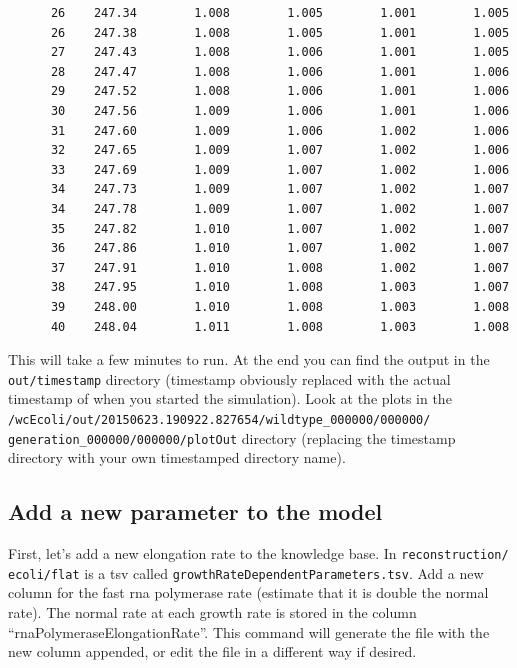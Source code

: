 \documentclass[12pt]{article}
\begin{document}
\begin{lstlisting}
      26    247.34        1.008        1.005        1.001        1.005
      26    247.38        1.008        1.005        1.001        1.005
      27    247.43        1.008        1.006        1.001        1.005
      28    247.47        1.008        1.006        1.001        1.006
      29    247.52        1.008        1.006        1.001        1.006
      30    247.56        1.009        1.006        1.001        1.006
      31    247.60        1.009        1.006        1.002        1.006
      32    247.65        1.009        1.007        1.002        1.006
      33    247.69        1.009        1.007        1.002        1.006
      34    247.73        1.009        1.007        1.002        1.007
      34    247.78        1.009        1.007        1.002        1.007
      35    247.82        1.010        1.007        1.002        1.007
      36    247.86        1.010        1.007        1.002        1.007
      37    247.91        1.010        1.008        1.002        1.007
      38    247.95        1.010        1.008        1.003        1.007
      39    248.00        1.010        1.008        1.003        1.008
      40    248.04        1.011        1.008        1.003        1.008
\end{lstlisting}

\hfill \break
\hfill \break

This will take a few minutes to run. At the end you can find the output in the \texttt{out/timestamp} directory (timestamp obviously replaced with the actual timestamp of when you started the simulation). Look at the plots in the \texttt{/wcEcoli/out/20150623.190922.827654/wildtype\_000000/000000/ \allowbreak generation\_000000/000000/plotOut} directory (replacing the timestamp directory with your own timestamped directory name).


\subsection{Add a new parameter to the model}

First, let's add a new elongation rate to the knowledge base. In \texttt{reconstruction/ \allowbreak ecoli/flat} is a tsv called \texttt{growthRateDependentParameters.tsv}. Add a new column for the fast rna polymerase rate (estimate that it is double the normal rate). The normal rate at each growth rate is stored in the column ``rnaPolymeraseElongationRate''. This command will generate the file with the new column appended, or edit the file in a different way if desired.
\end{document}
